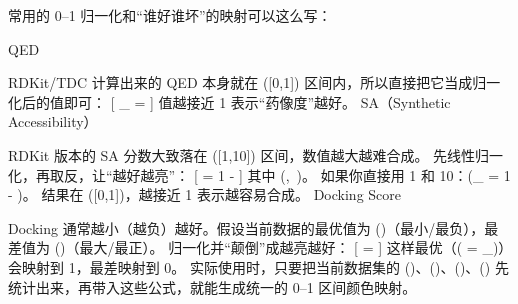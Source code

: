 常用的 0–1 归一化和“谁好谁坏”的映射可以这么写：

QED

RDKit/TDC 计算出来的 QED 本身就在 ([0,1]) 区间内，所以直接把它当成归一化后的值即可：
[
_{} = 
]
值越接近 1 表示“药像度”越好。
SA（Synthetic Accessibility）

RDKit 版本的 SA 分数大致落在 ([1,10]) 区间，数值越大越难合成。
先线性归一化，再取反，让“越好越亮”：
[
 = 1 - 
]
其中 (,\ )。
如果你直接用 1 和 10：(_{} = 1 - )。
结果在 ([0,1])，越接近 1 表示越容易合成。
Docking Score

Docking 通常越小（越负）越好。假设当前数据的最优值为 ()（最小/最负），最差值为 ()（最大/最正）。
归一化并“颠倒”成越亮越好：
[
 = 
]
这样最优（( = _{\min})）会映射到 1，最差映射到 0。
实际使用时，只要把当前数据集的 ()、()、()、() 先统计出来，再带入这些公式，就能生成统一的 0–1 区间颜色映射。